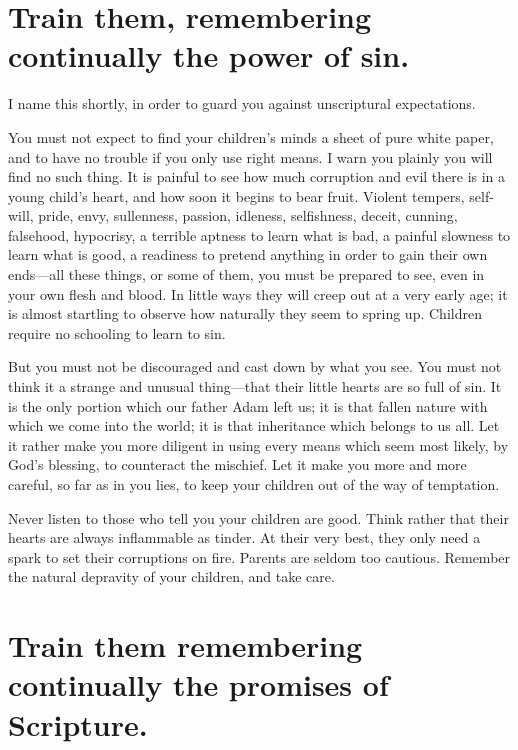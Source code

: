 \documentclass[
]{book}
\begin{document}
\hypertarget{train-them-remembering-continually-the-power-of-sin.}{%
\chapter{Train them, remembering continually the power of sin.}\label{train-them-remembering-continually-the-power-of-sin.}}

I name this shortly, in order to guard you against unscriptural expectations.

You must not expect to find your children's minds a sheet of pure white paper, and to have no trouble if you only use right means. I warn you plainly you will find no such thing. It is painful to see how much corruption and evil there is in a young child's heart, and how soon it begins to bear fruit. Violent tempers, self-will, pride, envy, sullenness, passion, idleness, selfishness, deceit, cunning, falsehood, hypocrisy, a terrible aptness to learn what is bad, a painful slowness to learn what is good, a readiness to pretend anything in order to gain their own ends---all these things, or some of them, you must be prepared to see, even in your own flesh and blood. In little ways they will creep out at a very early age; it is almost startling to observe how naturally they seem to spring up. Children require no schooling to learn to sin.

But you must not be discouraged and cast down by what you see. You must not think it a strange and unusual thing---that their little hearts are so full of sin. It is the only portion which our father Adam left us; it is that fallen nature with which we come into the world; it is that inheritance which belongs to us all. Let it rather make you more diligent in using every means which seem most likely, by God's blessing, to counteract the mischief. Let it make you more and more careful, so far as in you lies, to keep your children out of the way of temptation.

Never listen to those who tell you your children are good. Think rather that their hearts are always inflammable as tinder. At their very best, they only need a spark to set their corruptions on fire. Parents are seldom too cautious. Remember the natural depravity of your children, and take care.

\hypertarget{train-them-remembering-continually-the-promises-of-scripture.}{%
\chapter{Train them remembering continually the promises of Scripture.}\label{train-them-remembering-continually-the-promises-of-scripture.}}
\end{document}
